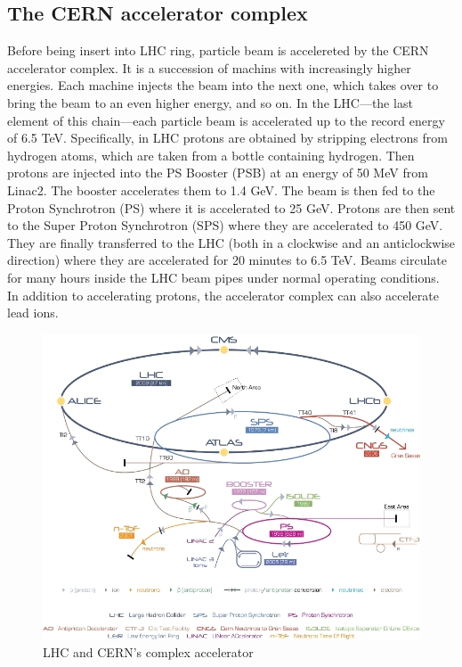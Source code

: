 \documentclass[a4paper, oneside]{book}
\begin{document}
			\subsection{The CERN accelerator complex}
			Before being insert into LHC ring, particle beam is accelereted by the CERN accelerator complex. It is a succession of machins with increasingly higher energies. Each machine injects the beam into the next one, which takes over to bring the beam to an even higher energy, and so on. In  the  LHC—the  last  element  of  this  chain—each particle beam is accelerated up to the record energy of 6.5 TeV. Specifically, in LHC protons are obtained by stripping electrons from hydrogen atoms, which are taken from a bottle containing hydrogen. Then protons are injected into the PS Booster (PSB) at an  energy of 50 MeV from Linac2. The  booster  accelerates  them  to  1.4  GeV.  The  beam  is  then  fed  to  the  Proton  Synchrotron  (PS)  where  it  is  accelerated  to  25 GeV. Protons are then sent to the Super Proton Synchrotron (SPS) where they are accelerated to 450 GeV. They  are  finally  transferred  to  the  LHC  (both  in  a  clockwise  and an anticlockwise direction) where they are accelerated for 20 minutes to 6.5 TeV. Beams circulate for many hours inside the LHC beam pipes under normal operating conditions. \\
			In addition to accelerating protons, the accelerator complex can also accelerate lead ions. \cite{Acc. complex} \\
			\begin{figure}
				\centering
				\includegraphics[width=0.3\textheight]{tesi_images/CERN.png}
				\caption{LHC and CERN's complex accelerator}
			\end{figure}
\end{document}
